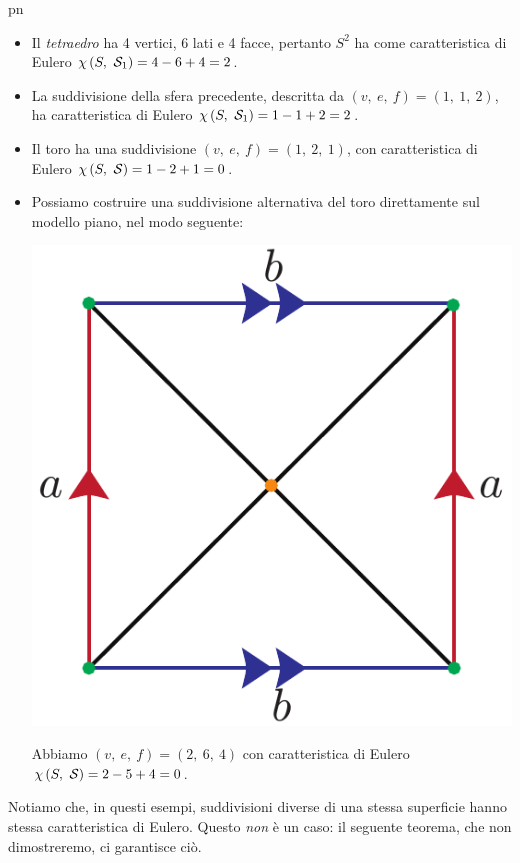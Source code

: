 \begin{example}{pn}~{}
	\begin{itemize}
		\item Il \textit{tetraedro} ha 4 vertici, 6 lati e 4 facce, pertanto $S^2$ ha come caratteristica di Eulero $\euler{S}{\mathcal{S}_1}=4-6+4=2$.
		\item La suddivisione della sfera precedente, descritta da
		$\left(v,\ e,\ f\right)=\left(1,\ 1,\ 2\right)$, ha caratteristica di Eulero $\euler{S}{\mathcal{S}_1}=1-1+2=2$.
		\item Il toro ha una suddivisione $\left(v,\ e,\ f\right)=\left(1,\ 2,\ 1\right)$, con caratteristica di Eulero $\euler{S}{\mathcal{S}}=1-2+1=0$.
		\item Possiamo costruire una suddivisione alternativa del toro direttamente sul modello piano, nel modo seguente:
		\begin{center}
			\includegraphics[trim=0cm 0cm 0cm 0cm, clip, scale=0.35]{images/torusmodelplane.pdf}
		\end{center}
	Abbiamo $\left(v,\ e,\ f\right)=\left(2,\ 6,\ 4\right)$ con caratteristica di Eulero $\euler{S}{\mathcal{S}}=2-5+4=0$.
	\end{itemize}
\end{example}
Notiamo che, in questi esempi, suddivisioni diverse di una stessa superficie hanno stessa caratteristica di Eulero. Questo \textit{non} è un caso: il seguente teorema, che non dimostreremo, ci garantisce ciò.
